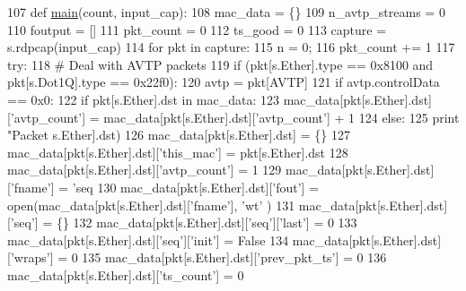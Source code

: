 \begin{DoxyCode}
107 \textcolor{keyword}{def }\hyperlink{namespaceavtp__astimes_a8ee95d891b3aa8e8887bc86fb3ccd3f4}{main}(count, input\_cap):
108     mac\_data = \{\}
109     n\_avtp\_streams = 0
110     foutput = []
111     pkt\_count = 0
112     ts\_good = 0
113     capture = s.rdpcap(input\_cap)
114     \textcolor{keywordflow}{for} pkt \textcolor{keywordflow}{in} capture:
115         n = 0;
116         pkt\_count += 1
117         \textcolor{keywordflow}{try}:
118             \textcolor{comment}{# Deal with AVTP packets}
119             \textcolor{keywordflow}{if} (pkt[s.Ether].type == 0x8100 \textcolor{keywordflow}{and} pkt[s.Dot1Q].type == 0x22f0):
120                 avtp = pkt[AVTP]
121                 \textcolor{keywordflow}{if} avtp.controlData == 0x0:
122                     \textcolor{keywordflow}{if} pkt[s.Ether].dst \textcolor{keywordflow}{in} mac\_data:
123                         mac\_data[pkt[s.Ether].dst][\textcolor{stringliteral}{'avtp\_count'}] = mac\_data[pkt[s.Ether].dst][\textcolor{stringliteral}{'avtp\_count'}]
       + 1
124                     \textcolor{keywordflow}{else}:
125                         \textcolor{keywordflow}{print} \textcolor{stringliteral}{"Packet %
      s.Ether].dst)
126                         mac\_data[pkt[s.Ether].dst] = \{\}
127                         mac\_data[pkt[s.Ether].dst][\textcolor{stringliteral}{'this\_mac'}] = pkt[s.Ether].dst
128                         mac\_data[pkt[s.Ether].dst][\textcolor{stringliteral}{'avtp\_count'}] = 1
129                         mac\_data[pkt[s.Ether].dst][\textcolor{stringliteral}{'fname'}] = \textcolor{stringliteral}{'seq%
130                         mac\_data[pkt[s.Ether].dst][\textcolor{stringliteral}{'fout'}] = open(mac\_data[pkt[s.Ether].dst][\textcolor{stringliteral}{'fname'}], \textcolor{stringliteral}{'wt'}
      )
131                         mac\_data[pkt[s.Ether].dst][\textcolor{stringliteral}{'seq'}] = \{\}
132                         mac\_data[pkt[s.Ether].dst][\textcolor{stringliteral}{'seq'}][\textcolor{stringliteral}{'last'}] = 0
133                         mac\_data[pkt[s.Ether].dst][\textcolor{stringliteral}{'seq'}][\textcolor{stringliteral}{'init'}] = \textcolor{keyword}{False}
134                         mac\_data[pkt[s.Ether].dst][\textcolor{stringliteral}{'wraps'}] = 0
135                         mac\_data[pkt[s.Ether].dst][\textcolor{stringliteral}{'prev\_pkt\_ts'}] = 0
136                         mac\_data[pkt[s.Ether].dst][\textcolor{stringliteral}{'ts\_count'}] = 0
}}
\end{DoxyCode}
